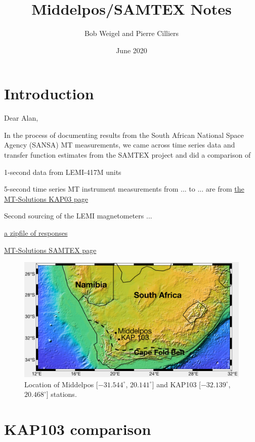 \documentclass{article}
\title{Middelpos/SAMTEX Notes}
\author{Bob Weigel and Pierre Cilliers}
\date{June 2020}
\begin{document}

\section{Introduction}

Dear Alan,

In the process of documenting results from the South African National Space Agency (SANSA) MT measurements, we came across time series data and transfer function estimates from the SAMTEX project and did a comparison of 

1-second data from LEMI-417M units 

5-second time series MT instrument measurements from ... to ... are from \href{https://www.mtnet.info/data/kap03/kap03.html}{the MT-Solutions KAP03 page}

Second sourcing of the LEMI magnetometers ... 

\href{https://www.mtnet.info/data/samtex/samtex.zip}{a zipfile of responses}


\href{https://www.mtnet.info/data/samtex/samtex.html}{MT-Solutions SAMTEX page}

\begin{figure}[h!]
\centering
\includegraphics[width=\textwidth]{figures/map.pdf}
\caption{Location of Middelpos [$-31.544^\circ$, $20.141^\circ$] and KAP103 [$-32.139^\circ$, $20.468^\circ$] stations.}
\label{fig:map}
\end{figure}

\clearpage

\section{KAP103 comparison}
\end{document}
